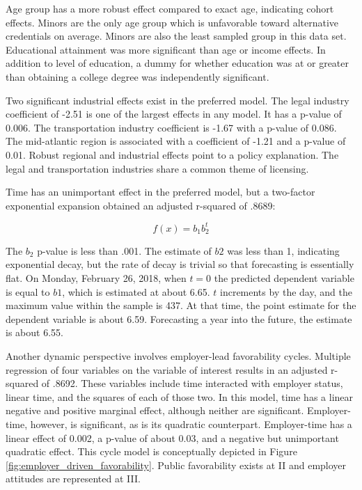\documentclass[review]{elsarticle}
\begin{document}
        Age group has a more robust effect compared to exact age, indicating cohort effects.
        Minors are the only age group which is unfavorable toward alternative credentials on average.
        Minors are also the least sampled group in this data set.
        Educational attainment was more significant than age or income effects.
        In addition to level of education, a dummy for whether education was at or greater than
        obtaining a college degree was independently significant.
        
        Two significant industrial effects exist in the preferred model.
        The legal industry coefficient of -2.51 is one of the largest effects in any model.
        It has a p-value of 0.006.
        The transportation industry coefficient is -1.67 with a p-value of 0.086.
        The mid-atlantic region is associated with a coefficient of -1.21 and a p-value of 0.01.
        Robust regional and industrial effects point to a policy explanation.
        The legal and transportation industries share a common theme of licensing.
        
        Time has an unimportant effect in the preferred model,
        but a two-factor exponential expansion obtained an adjusted r-squared of .8689:
        
        \begin{equation} f(x) = b_1b_2^t \end{equation}
        
        The $b_2$ p-value is less than .001. The estimate of $b2$ was less than 1, indicating exponential
        decay, but the rate of decay is trivial so that forecasting is essentially flat.
        On Monday, February 26, 2018, when $t=0$ the predicted dependent variable is equal to $b1$, which is estimated at about 6.65.
        $t$ increments by the day, and the maximum value within the sample is 437. At that time, the point estimate
        for the dependent variable is about 6.59. Forecasting a year into the future, the estimate is about 6.55.
        
        Another dynamic perspective involves employer-lead favorability cycles.
        Multiple regression of four variables on the variable of interest results in an adjusted r-squared of .8692.
        These variables include time interacted with employer status, linear time, and the squares of each of
        those two.
        In this model, time has a linear negative and positive marginal effect, although neither are significant.
        Employer-time, however, is significant, as is its quadratic counterpart.
        Employer-time has a linear effect of 0.002, a p-value of about 0.03, and a negative but unimportant
        quadratic effect.
        This cycle model is conceptually depicted in Figure \ref{fig:employer_driven_favorability}.
        Public favorability exists at II and employer attitudes are represented at III.
        
\end{document}
